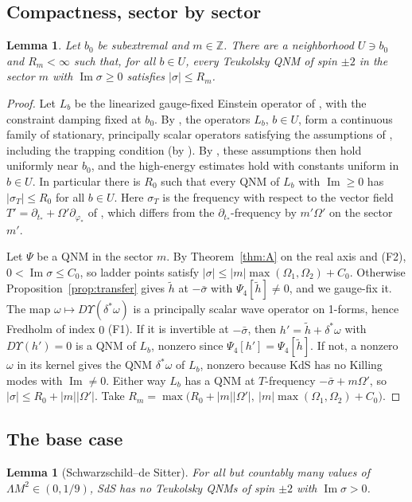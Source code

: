 \documentclass[11pt]{amsart}
\newtheorem{lemma}[theorem]{Lemma}
\theoremstyle{definition}
\theoremstyle{remark}
\numberwithin{equation}{section}
\newcommand{\Z}{\mathbb{Z}}
\renewcommand{\Im}{\operatorname{Im}}
\begin{document}
\subsection{Compactness, sector by sector}
\begin{lemma}\label{lem:compact}
Let $b_0$ be subextremal and $m\in\Z$. There are a neighborhood $U\ni b_0$ and $R_m<\infty$ such that, for all
$b\in U$, every Teukolsky QNM of spin $\pm2$ in the sector $m$ with $\Im\sigma\ge0$ satisfies $|\sigma|\le R_m$.
\end{lemma}

\begin{proof}
Let $L_b$ be the linearized gauge-fixed Einstein operator of \cite[(23)]{HPV25}, with the constraint damping fixed at
$b_0$. By \cite[Remark~2.12 and \S2.5]{HPV25}, the operators $L_b$, $b\in U$, form a continuous family of stationary,
principally scalar operators satisfying the assumptions of \cite[\S5.1]{HV18}, including the trapping condition
(by \cite[Theorem~3.1]{HPV25}). By \cite[\S5.1.2]{HV18}, these assumptions then hold uniformly near $b_0$, and the
high-energy estimates \cite[(5.7), (5.8)]{HV18} hold with constants uniform in $b\in U$. In particular there is $R_0$
such that every QNM of $L_b$ with $\Im\ge0$ has $|\sigma_T|\le R_0$ for all $b\in U$. Here $\sigma_T$
is the frequency with respect to the vector field $T'=\partial_{t_*}+\Omega'\partial_{\varphi_*}$ of \cite{HPV25}, which differs
from the $\partial_{t_*}$-frequency by $m'\Omega'$ on the sector $m'$.

Let $\Psi$ be a QNM in the sector $m$. By Theorem~\ref{thm:A} on the real axis and (F2), $0<\Im\sigma\le C_0$, so
ladder points satisfy $|\sigma|\le|m|\max(\Omega_1,\Omega_2)+C_0$. Otherwise Proposition~\ref{prop:transfer} gives
$\tilde h$ at $-\bar\sigma$ with $\Psi_4[\tilde h]\ne0$, and we gauge-fix it. The map $\omega\mapsto D\Upsilon(\delta^*\omega)$
is a principally scalar wave operator on 1-forms, hence Fredholm of index $0$ (F1). If it is invertible at
$-\bar\sigma$, then $h'=\tilde h+\delta^*\omega$ with $D\Upsilon(h')=0$ is a QNM of $L_b$, nonzero since
$\Psi_4[h']=\Psi_4[\tilde h]$. If not, a nonzero $\omega$ in its kernel gives the QNM $\delta^*\omega$ of $L_b$, nonzero
because KdS has no Killing modes with $\Im\ne0$. Either way $L_b$ has a QNM at $T$-frequency $-\bar\sigma+m\Omega'$, so
$|\sigma|\le R_0+|m||\Omega'|$. Take $R_m=\max\big(R_0+|m||\Omega'|,\ |m|\max(\Omega_1,\Omega_2)+C_0\big)$.
\end{proof}

\subsection{The base case}
\begin{lemma}[Schwarzschild--de Sitter]\label{lem:sds}
For all but countably many values of $\Lambda M^2\in(0,1/9)$, SdS has no Teukolsky QNMs of spin $\pm2$ with
$\Im\sigma>0$.
\end{lemma}
\end{document}
